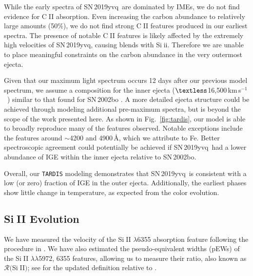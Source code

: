 \documentclass[twocolumn]{aastex63}
\def\ion#1#2{#1$\;${\footnotesize\rm{#2}}\relax}
\newcommand{\kms}{km\,s$^{-1}$}
\newcommand{\sn}{SN\,2019yvq}
\begin{document}
While the early spectra of \sn\ are dominated by IMEs, we do not find evidence
for \ion{C}{II} absorption. Even increasing the carbon abundance to relatively
large amounts (50\%), we do not find strong \ion{C}{II} features produced in
our earliest spectra. The presence of notable \ion{C}{II} features is likely
affected by the extremely high velocities of \sn, causing blends with
\ion{Si}{ii}. Therefore we are unable to place meaningful constraints on the
carbon abundance in the very outermost ejecta.

Given that our maximum light spectrum occurs 12 days after our previous model
spectrum, we assume a composition for the inner ejecta
($\textless$16,500\,\kms\ ) similar to that found for SN\,2002bo
\citep{Stehle05}. A more detailed ejecta structure could be achieved through
modeling additional pre-maximum spectra, but is beyond the scope of the work
presented here. As shown in Fig.~\ref{fig:tardis}, our model is able to
broadly reproduce many of the features observed. Notable exceptions include
the features around $\sim$4200 and 4900\,\AA, which we attribute to Fe.
Better spectroscopic agreement could potentially be achieved if \sn\ had
a lower abundance of IGE within the inner ejecta relative to SN\,2002bo.

Overall, our \texttt{TARDIS} modeling demonstrates that \sn\ is consistent
with a low (or zero) fraction of IGE in the outer ejecta. Additionally, the
earliest phases show little change in temperature, as expected from the
color evolution.

\subsection{\ion{Si}{II} Evolution}\label{sec:SiII}

We have measured the velocity of the \ion{Si}{II} $\lambda$6355 absorption
feature following the procedure in \citet[][see their \S2.5]{Maguire14}. We
have also estimated the pseudo-equivalent widths (pEWs) of the \ion{Si}{II}
$\lambda\lambda$5972, 6355 features, allowing us to measure their ratio, also
known as $\mathcal{R}($\ion{Si}{II}$)$; see \citet{Hachinger08} for the
updated definition relative to \citet{Nugent95}.
\end{document}
